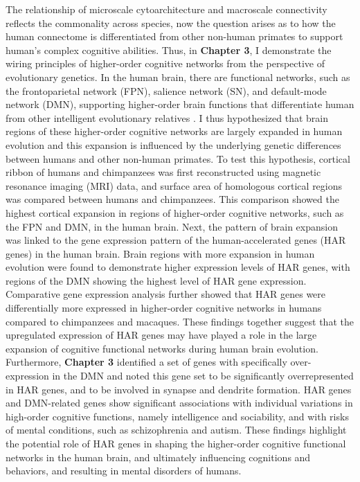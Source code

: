 \begin{refsection}
The relationship of microscale cytoarchitecture and macroscale connectivity reflects the commonality across species, now the question arises as to how the human connectome is differentiated from other non-human primates to support human’s complex cognitive abilities. Thus, in \textbf{Chapter 3}, I demonstrate the wiring principles of higher-order cognitive networks from the perspective of evolutionary genetics. In the human brain, there are functional networks, such as the frontoparietal network (FPN), salience network (SN), and default-mode network (DMN), supporting higher-order brain functions that differentiate human from other intelligent evolutionary relatives \citep{buckner2013evolution}. I thus hypothesized that brain regions of these higher-order cognitive networks are largely expanded in human evolution and this expansion is influenced by the underlying genetic differences between humans and other non-human primates. To test this hypothesis, cortical ribbon of humans and chimpanzees was first reconstructed using magnetic resonance imaging (MRI) data, and surface area of homologous cortical regions was compared between humans and chimpanzees. This comparison showed the highest cortical expansion in regions of higher-order cognitive networks, such as the FPN and DMN, in the human brain. Next, the pattern of brain expansion was linked to the gene expression pattern of the human-accelerated genes (HAR genes) in the human brain. Brain regions with more expansion in human evolution were found to demonstrate higher expression levels of HAR genes, with regions of the DMN showing the highest level of HAR gene expression. Comparative gene expression analysis further showed that HAR genes were differentially more expressed in higher-order cognitive networks in humans compared to chimpanzees and macaques. These findings together suggest that the upregulated expression of HAR genes may have played a role in the large expansion of cognitive functional networks during human brain evolution. Furthermore, \textbf{Chapter 3} identified a set of genes with specifically over-expression in the DMN and noted this gene set to be significantly overrepresented in HAR genes, and to be involved in synapse and dendrite formation. HAR genes and DMN-related genes show significant associations with individual variations in high-order cognitive functions, namely intelligence and sociability, and with risks of mental conditions, such as schizophrenia and autism. These findings highlight the potential role of HAR genes in shaping the higher-order cognitive functional networks in the human brain, and ultimately influencing cognitions and behaviors, and resulting in mental disorders of humans.


\end{refsection}
